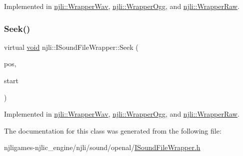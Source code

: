Implemented in \mbox{\hyperlink{classnjli_1_1_wrapper_wav_ab24f4e589680e0abe321e105f01468bf}{njli\+::\+Wrapper\+Wav}}, \mbox{\hyperlink{classnjli_1_1_wrapper_ogg_a28d1964b0a03208ebeb30e09ef625c90}{njli\+::\+Wrapper\+Ogg}}, and \mbox{\hyperlink{classnjli_1_1_wrapper_raw_ab48755f1c7d217737288bfe4c6320c16}{njli\+::\+Wrapper\+Raw}}.

\mbox{\label{classnjli_1_1_i_sound_file_wrapper_a22241a77b7d6adf55045a7a30ec5ef30}} 
\subsubsection{\texorpdfstring{Seek()}{Seek()}}
{\footnotesize\ttfamily virtual \mbox{\hyperlink{_thread_8h_af1e856da2e658414cb2456cb6f7ebc66}{void}} njli\+::\+I\+Sound\+File\+Wrapper\+::\+Seek (\begin{DoxyParamCaption}\item[{size\+\_\+t}]{pos,  }\item[{\mbox{\hyperlink{classnjli_1_1_i_sound_file_wrapper_ab4b07720cb2823b4f3f9fa98ee07a6e7}{S\+E\+E\+K\+\_\+\+P\+OS}}}]{start }\end{DoxyParamCaption})\hspace{0.3cm}{\ttfamily [pure virtual]}}



Implemented in \mbox{\hyperlink{classnjli_1_1_wrapper_wav_aa75e013ec22ca84b54ee33428dcd3d09}{njli\+::\+Wrapper\+Wav}}, \mbox{\hyperlink{classnjli_1_1_wrapper_ogg_adc4b8116a89e8eb48f65276ec46e8dd2}{njli\+::\+Wrapper\+Ogg}}, and \mbox{\hyperlink{classnjli_1_1_wrapper_raw_a9ffac2e6ec0dca3b9592fba9e29ba3f4}{njli\+::\+Wrapper\+Raw}}.



The documentation for this class was generated from the following file\+:\begin{DoxyCompactItemize}
\item 
njligames-\/njlic\+\_\+engine/njli/sound/openal/\mbox{\hyperlink{_i_sound_file_wrapper_8h}{I\+Sound\+File\+Wrapper.\+h}}\end{DoxyCompactItemize}
